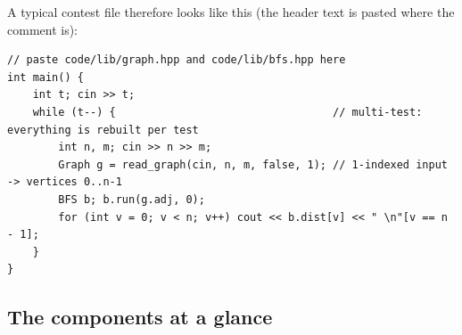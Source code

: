 A typical contest file therefore looks like this (the header text is pasted where the comment is):

\begin{lstlisting}[style=snippet]
// paste code/lib/graph.hpp and code/lib/bfs.hpp here
int main() {
    int t; cin >> t;
    while (t--) {                                  // multi-test: everything is rebuilt per test
        int n, m; cin >> n >> m;
        Graph g = read_graph(cin, n, m, false, 1); // 1-indexed input -> vertices 0..n-1
        BFS b; b.run(g.adj, 0);
        for (int v = 0; v < n; v++) cout << b.dist[v] << " \n"[v == n - 1];
    }
}
\end{lstlisting}

\subsection*{The components at a glance}


